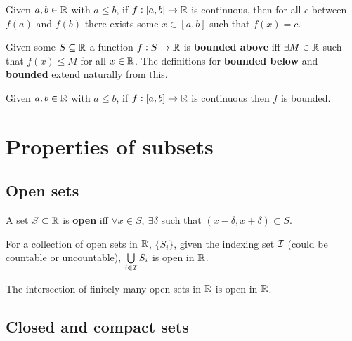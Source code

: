 \documentclass[../Year1.tex]{subfiles}
\begin{document}
\begin{theorem}
    Given $a,b\in\mathbb{R}$ with $a\leq b$, if $f:[a,b]\rightarrow\mathbb{R}$ is continuous, then for all $c$ between $f(a)$ and $f(b)$ there exists some $x\in[a,b]$ such that $f(x)=c$.
\end{theorem}

\begin{definition}
    Given some $S\subseteq\mathbb{R}$ a function $f:S\rightarrow\mathbb{R}$ is \textbf{bounded above} iff $\exists M\in\mathbb{R}$ such that $f(x)\leq M$ for all $x\in\mathbb{R}$. The definitions for \textbf{bounded below} and \textbf{bounded} extend naturally from this.
\end{definition}

\begin{theorem}
    Given $a,b\in\mathbb{R}$ with $a\leq b$, if $f:[a,b]\rightarrow\mathbb{R}$ is continuous then $f$ is bounded.
\end{theorem}

\section{Properties of subsets}

\subsection{Open sets}

\begin{definition}
    A set $S\subset\mathbb{R}$ is \textbf{open} iff $\forall x\in S, \ \exists\delta$ such that $(x-\delta,x+\delta)\subset S$.
\end{definition}

\begin{theorem}
    For a collection of open sets in $\mathbb{R}$, $\{S_i\}$, given the indexing set $\mathcal{I}$ (could be countable or uncountable), $\bigcup\limits_{i\in\mathcal{I}}S_i$ is open in $\mathbb{R}$.
\end{theorem}

\begin{theorem}
    The intersection of finitely many open sets in $\mathbb{R}$ is open in $\mathbb{R}$.
\end{theorem}

\subsection{Closed and compact sets}
\end{document}
